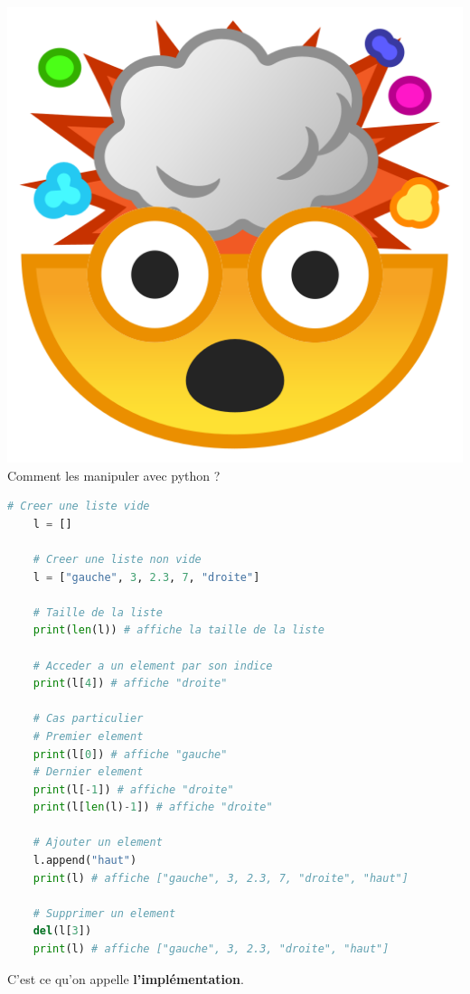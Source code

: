 \includegraphics[scale=0.03]{Thème 1 – Structures de données/Chapitre 1 - Interface et implémentation/BLOB/mindblow}{\selectfont
Comment les manipuler avec python ?\\
}
\begin{lstlisting}[language=Python]
    # Creer une liste vide 
    l = []

    # Creer une liste non vide
    l = ["gauche", 3, 2.3, 7, "droite"]

    # Taille de la liste
    print(len(l)) # affiche la taille de la liste

    # Acceder a un element par son indice
    print(l[4]) # affiche "droite"

    # Cas particulier
    # Premier element
    print(l[0]) # affiche "gauche"
    # Dernier element 
    print(l[-1]) # affiche "droite"
    print(l[len(l)-1]) # affiche "droite"

    # Ajouter un element
    l.append("haut")
    print(l) # affiche ["gauche", 3, 2.3, 7, "droite", "haut"]

    # Supprimer un element
    del(l[3])
    print(l) # affiche ["gauche", 3, 2.3, "droite", "haut"]
\end{lstlisting}

C'est ce qu'on appelle \textbf{l'implémentation}.\\

